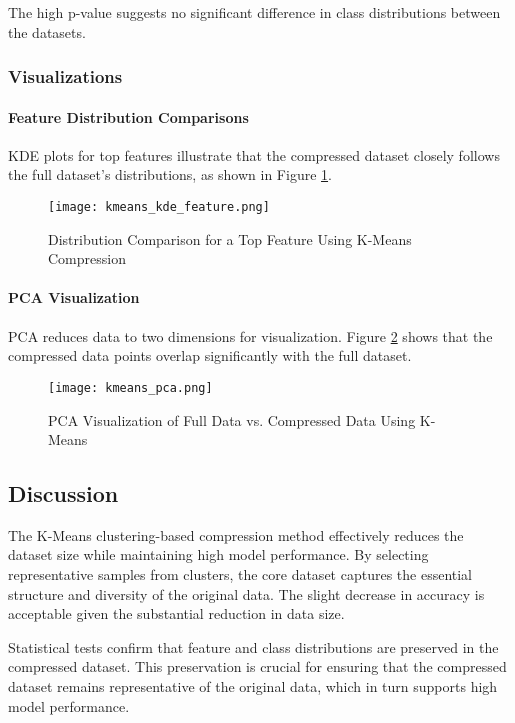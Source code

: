\documentclass{article}
\begin{document}
The high p-value suggests no significant difference in class distributions between the datasets.

\subsubsection{Visualizations}

\paragraph{Feature Distribution Comparisons}

KDE plots for top features illustrate that the compressed dataset closely follows the full dataset's distributions, as shown in Figure \ref{fig:kmeans_kde_feature}.

\begin{figure}[H]
\centering
\texttt{[image: kmeans\_kde\_feature.png]}
\caption{Distribution Comparison for a Top Feature Using K-Means Compression}
\label{fig:kmeans_kde_feature}
\end{figure}

\paragraph{PCA Visualization}

PCA reduces data to two dimensions for visualization. Figure \ref{fig:kmeans_pca} shows that the compressed data points overlap significantly with the full dataset.

\begin{figure}[H]
\centering
\texttt{[image: kmeans\_pca.png]}
\caption{PCA Visualization of Full Data vs. Compressed Data Using K-Means}
\label{fig:kmeans_pca}
\end{figure}

\subsection{Discussion}

The K-Means clustering-based compression method effectively reduces the dataset size while maintaining high model performance. By selecting representative samples from clusters, the core dataset captures the essential structure and diversity of the original data. The slight decrease in accuracy is acceptable given the substantial reduction in data size.

Statistical tests confirm that feature and class distributions are preserved in the compressed dataset. This preservation is crucial for ensuring that the compressed dataset remains representative of the original data, which in turn supports high model performance.
\end{document}
